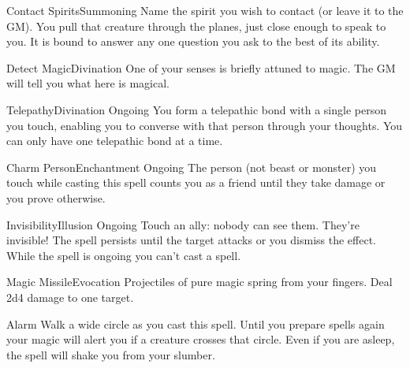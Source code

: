 \documentclass[8pt]{extarticle}
\begin{document}
\begin{multicols}{2}

  \begin{aspell}{Contact Spirits}{Summoning}
    Name the spirit you wish to contact (or leave it to the GM). You
    pull that creature through the planes, just close enough to speak
    to you. It is bound to answer any one question you ask to the best
    of its ability.
  \end{aspell}

  \begin{aspell}{Detect Magic}{Divination}
    One of your senses is briefly attuned to magic. The GM will tell
    you what here is magical.
  \end{aspell}

  \begin{aspell}{Telepathy}{Divination Ongoing}
    You form a telepathic bond with a single person you touch,
    enabling you to converse with that person through your
    thoughts. You can only have one telepathic bond at a time.
  \end{aspell}

\vfill\null
\columnbreak

\begin{aspell}{Charm Person}{Enchantment Ongoing}
  The person (not beast or monster) you touch while casting this spell
  counts you as a friend until they take damage or you prove
  otherwise.
\end{aspell}

\begin{aspell}{Invisibility}{Illusion Ongoing}
  Touch an ally: nobody can see them. They’re invisible! The spell
  persists until the target attacks or you dismiss the effect. While
  the spell is ongoing you can’t cast a spell.
\end{aspell}

\begin{aspell}{Magic Missile}{Evocation}
  Projectiles of pure magic spring from your fingers. Deal 2d4 damage
  to one target.
\end{aspell}

\begin{aspell}{Alarm}{}
  Walk a wide circle as you cast this spell. Until you prepare spells
  again your magic will alert you if a creature crosses that
  circle. Even if you are asleep, the spell will shake you from your
  slumber.
\end{aspell}


\vfill\null
\end{multicols}
\end{document}
